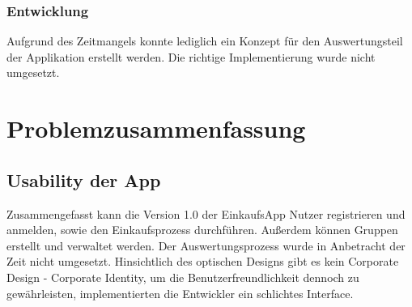 \documentclass[12pt,a4paper]{article}
\begin{document}
\subsubsection*{Entwicklung}
Aufgrund des Zeitmangels konnte lediglich ein Konzept für den Auswertungsteil der Applikation erstellt werden. Die richtige Implementierung wurde nicht umgesetzt.
\newpage

\section{Problemzusammenfassung}
\subsection{Usability der App}
Zusammengefasst kann die Version 1.0 der EinkaufsApp Nutzer registrieren und anmelden, sowie den Einkaufsprozess durchführen. Außerdem können Gruppen erstellt und verwaltet werden. Der Auswertungsprozess wurde in Anbetracht der Zeit nicht umgesetzt. Hinsichtlich des optischen Designs gibt es kein Corporate Design - Corporate Identity, um die Benutzerfreundlichkeit dennoch zu gewährleisten, implementierten die Entwickler ein schlichtes Interface.
\newpage
\end{document}
